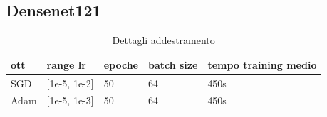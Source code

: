 \subsection{Densenet121}

\begin{table}[H]
\centering
\caption{Dettagli addestramento}
\begin{tabular}{|l|l|l|l|l|}
\hline
\textbf{ott} & \textbf{range lr} & \textbf{epoche} & \textbf{batch size} & \textbf{tempo training medio} \\ \hline
SGD          & [1e-5, 1e-2]         & 50              & 64                  & 450s                          \\ \hline
Adam         & [1e-5, 1e-3]        & 50              & 64                  & 450s                          \\ \hline
\end{tabular}
\end{table}
